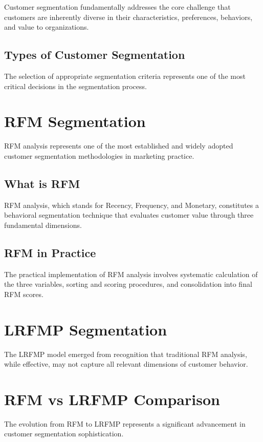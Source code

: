 \documentclass[12pt, a4paper, oneside]{report}
\begin{document}
Customer segmentation fundamentally addresses the core challenge that customers are inherently diverse in their characteristics, preferences, behaviors, and value to organizations.

\subsection{Types of Customer Segmentation}

The selection of appropriate segmentation criteria represents one of the most critical decisions in the segmentation process.


\section{RFM Segmentation}

RFM analysis represents one of the most established and widely adopted customer segmentation methodologies in marketing practice.

\subsection{What is RFM}

RFM analysis, which stands for Recency, Frequency, and Monetary, constitutes a behavioral segmentation technique that evaluates customer value through three fundamental dimensions.

\subsection{RFM in Practice}

The practical implementation of RFM analysis involves systematic calculation of the three variables, sorting and scoring procedures, and consolidation into final RFM scores.


\section{LRFMP Segmentation}

The LRFMP model emerged from recognition that traditional RFM analysis, while effective, may not capture all relevant dimensions of customer behavior.


\section{RFM vs LRFMP Comparison}

The evolution from RFM to LRFMP represents a significant advancement in customer segmentation sophistication.
\end{document}
